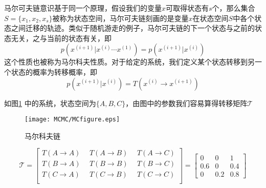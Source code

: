 马尔可夫链意识基于同一个原理，假设我们的变量$x$可取得状态有$s$个，那么集合$S = \{x_1, x_2, x_s\}$被称为状态空间，马尔可夫链刻画的是变量$x$在状态空间$S$中各个状态之间迁移的轨迹。类似于随机游走的例子，马尔可夫链的下一个状态与之前的状态无关，之与当前的状态有关，即
\begin{equation}
p(x^{(i+1)} | x^{(i)} \cdots x^{(1)}) = p(x^{(i+1)} | x^{(i)})
\end{equation}
这个性质也被称为马尔科夫性质。对于给定的系统，我们定义某个状态转移到另一个状态的概率为转移概率，即
\begin{equation}
p(x^{(i+1)} | x^{(i)}) = T(x^{(i)} \rightarrow x^{(i+1)})
\end{equation}

如图\ref{img:MCfigure} 中的系统，状态空间为$\{A, B, C\}$，由图中的参数我们容易算得转移矩阵$\mathcal{T}$
\begin{figure}[htbp]
\centering
\texttt{[image: MCMC/MCfigure.eps]}
\caption{马尔科夫链}\label{img:MCfigure}
\end{figure}
\begin{equation}
\mathcal{T} = \left[
\begin{array}{ccc}
T(A\rightarrow A)~~ & T(A\rightarrow B)~~ & T(A\rightarrow C)\\
T(B\rightarrow A)~~ & T(B\rightarrow B)~~ & T(B\rightarrow C)\\
T(C\rightarrow A)~~ & T(C\rightarrow B)~~ & T(C\rightarrow C)\\
\end{array}
\right]
=\left[
\begin{array}{ccc}
0 & 0 & 1\\
0.6 &0 & 0.4\\
0 & 0.2 & 0.8
\end{array}
\right]
\end{equation}

